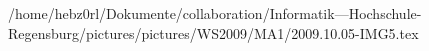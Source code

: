 /home/hebz0rl/Dokumente/collaboration/Informatik---Hochschule-Regensburg/pictures/pictures/WS2009/MA1/2009.10.05-IMG5.tex